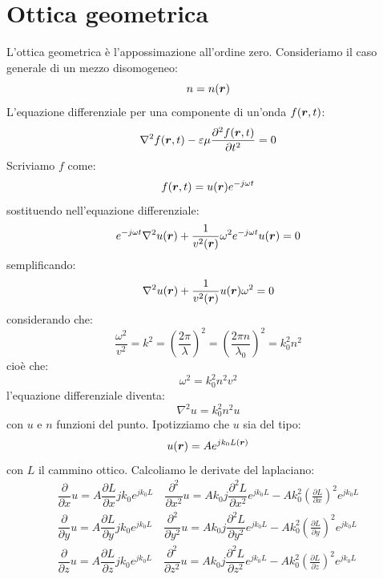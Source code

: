 \section{Ottica geometrica}
L'ottica geometrica è l'appossimazione all'ordine zero. Consideriamo il caso generale di un mezzo disomogeneo:
\begin{equation}
  n=n(\boldsymbol{r})
\end{equation}
L'equazione differenziale per una componente di un'onda $f(\boldsymbol{r},t)$:
\begin{equation}
  \nabla^2 f(\boldsymbol{r},t)-\varepsilon\mu\frac{\partial^2 f(\boldsymbol{r},t)}{\partial t^2}=0
\end{equation}
Scriviamo $f$ come:
\begin{equation}
  f(\boldsymbol{r},t)=u(\boldsymbol{r})e^{-j\omega t}
\end{equation}
sostituendo nell'equazione differenziale:
\begin{equation}
  e^{-j\omega t}\nabla^2 u(\boldsymbol{r})+\frac{1}{v^2(\boldsymbol{r})}\omega^2e^{-j\omega t}u(\boldsymbol{r})=0
\end{equation}
semplificando:
\begin{equation}
  \nabla^2 u(\boldsymbol{r})+\frac{1}{v^2(\boldsymbol{r})}u(\boldsymbol{r})\omega^2=0
\end{equation}
considerando che:
\begin{equation}
  \frac{\omega^2}{v^2}=k^2=\left(\frac{2\pi}{\lambda}\right)^2=\left(\frac{2\pi n}{\lambda_0}\right)^2=k_0^2n^2
\end{equation}
cioè che:
\begin{equation}
  \omega^2=k_0^2n^2v^2
\end{equation}
l'equazione differenziale diventa:
\begin{equation}
  \nabla^2 u=k_0^2n^2 u
  \label{238}
\end{equation}
con $u$ e $n$ funzioni del punto. Ipotizziamo che $u$ sia del tipo:
\begin{equation}
  u(\boldsymbol{r})=Ae^{jk_0 L(\boldsymbol{r})}
\end{equation}
con $L$ il cammino ottico. Calcoliamo le derivate del laplaciano:
\begin{gather*}
  \dfrac{\partial}{\partial x} u = A\dfrac{\partial L}{\partial x}jk_0e^{j k_0 L}\quad\dfrac{\partial^2}{\partial x^2} u =Ak_0j\dfrac{\partial^2 L}{\partial x^2}e^{j k_0 L}-Ak_0^2\left(\frac{\partial L}{\partial x}\right)^2 e^{jk_0 L}\\
  \dfrac{\partial}{\partial y} u = A\dfrac{\partial L}{\partial y}jk_0e^{j k_0 L}\quad\dfrac{\partial^2}{\partial y^2} u =Ak_0j\dfrac{\partial^2 L}{\partial y^2}e^{j k_0 L}-Ak_0^2\left(\frac{\partial L}{\partial y}\right)^2 e^{jk_0 L}\\
  \dfrac{\partial}{\partial z} u = A\dfrac{\partial L}{\partial z}jk_0e^{j k_0 L}\quad\dfrac{\partial^2}{\partial z^2} u =Ak_0j\dfrac{\partial^2 L}{\partial z^2}e^{j k_0 L}-Ak_0^2\left(\frac{\partial L}{\partial z}\right)^2 e^{jk_0 L}\\
\end{gather*}
